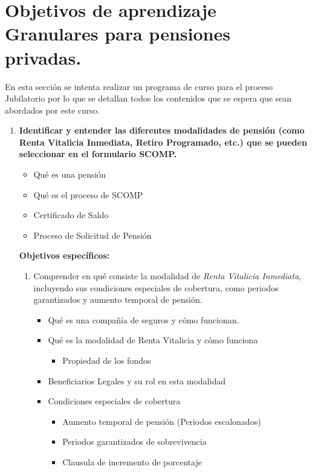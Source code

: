 \newpage
\section{Objetivos de aprendizaje Granulares para pensiones privadas.}

En esta sección se intenta realizar un programa de curso para el proceso Jubilatorio por lo que se detallan todos los contenidos que se espera que sean abordados por este curso. 
\vspace{0.2cm}
\begin{enumerate}
    \item \textbf{Identificar y entender las diferentes modalidades de pensión (como Renta Vitalicia Inmediata, Retiro Programado, etc.) que se pueden seleccionar en el formulario SCOMP.} 
        \begin{itemize}
            \item Qué es una pensión 
            \item Qué es el proceso de SCOMP 
            \item Certificado de Saldo 
            \item Proceso de Solicitud de Pensión 
        \end{itemize}    
        \textbf{Objetivos específicos: }
        \begin{enumerate}
            \item Comprender en qué consiste la modalidad de \textit{Renta Vitalicia Inmediata}, incluyendo sus condiciones especiales de cobertura, como periodos garantizados y aumento temporal de pensión.
            \begin{itemize}
                \item Qué es una compañía de seguros y cómo funcionan.
                \item Qué es la modalidad de Renta Vitalicia y cómo funciona 
                \begin{itemize}
                    \item Propiedad de los fondos
                \end{itemize}
                \item Beneficiarios Legales y su rol en esta modalidad
                \item Condiciones especiales de cobertura
                \begin{itemize}
                    \item Aumento temporal de pensión (Periodos escalonados) 
                    \item Periodos garantizados de sobrevivencia 
                    \item Clausula de incremento de porcentaje 
                \end{itemize}
            \end{itemize}
    

\end{enumerate}
\end{enumerate}

